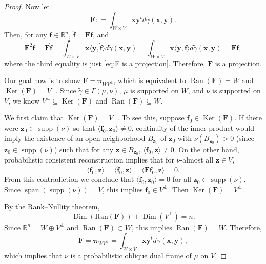 \documentclass{amsart}
\numberwithin{equation}{section}
\DeclareMathOperator{\supp}{supp}
\DeclareMathOperator{\kernel}{Ker}
\DeclareMathOperator{\range}{Ran}
\DeclareMathOperator{\Dim}{Dim}
\DeclareMathOperator{\spanning}{span}
\newcommand{\bpi}{{\boldsymbol{\pi}}}
\theoremstyle{plain}
\theoremstyle{remark}
\theoremstyle{definition}
\begin{document}
\begin{proof}
Now let 
\begin{equation*}
       \mathbf{F}: = \int_{W \times V} \mathbf{x} \mathbf{y}^t d\tilde{\gamma}(\mathbf{x}, \mathbf{y}).
    \end{equation*}
Then, for any $\mathbf{f} \in \mathbb{R}^n$, $\hat{\mathbf{f}} = \mathbf{F} \mathbf{f}$, and
\begin{equation*}
    \mathbf{F}^2 \mathbf{f} = \mathbf{F} \hat{\mathbf{f}} = \int_{W \times V} \mathbf{x} \langle \mathbf{y},  \hat{\mathbf{f}} \rangle d\tilde{\gamma}(\mathbf{x}, \mathbf{y}) = \int_{W \times V} \mathbf{x} \langle \mathbf{y},  \mathbf{f} \rangle d\tilde{\gamma}(\mathbf{x}, \mathbf{y}) = \mathbf{F} \mathbf{f},
\end{equation*}
where the third equality is just \eqref{eq:F is a projection}. Therefore, $\mathbf{F}$ is a projection.

Our goal now is to show $\mathbf{F} = \bpi_{WV^\perp}$, which is equivalent to $\range(\mathbf{F})=W$ and $\kernel(\mathbf{F}) = V^\perp$. 
Since $\tilde{\gamma} \in \Gamma(\mu, \nu)$, $\mu$ is supported on $W$, and $\nu$ is supported on $V$, we know $V^\perp \subseteq \kernel(\mathbf{F})$ and $\range(\mathbf{F}) \subseteq W$.  

We first claim that $\kernel(\mathbf{F})= V^\perp$. To see this, suppose $\mathbf{f}_0 \in \kernel(\mathbf{F})$. If there were $\mathbf{z}_0 \in \supp(\nu)$ so that $\langle \mathbf{f}_0, \mathbf{z}_0 \rangle \neq 0$, continuity of the inner product would imply the existence of an open neighborhood $B_{\mathbf{z}_0}$ of $\mathbf{z}_0$ with $\nu(B_{\mathbf{z}_0})>0$ (since $\mathbf{z}_0 \in \supp(\nu)$) such that for any $\mathbf{z} \in B_{\mathbf{z}_0}$, $ \langle \mathbf{f}_0, \mathbf{z}  \rangle \neq 0 $. On the other hand, probabilistic consistent reconstruction implies that for $\nu$-almost all $\mathbf{z} \in V$, 
\[
    \langle \mathbf{f}_0, \mathbf{z}  \rangle = \langle \hat{\mathbf{f}}_0,  \mathbf{z} \rangle = \langle \mathbf{F}\mathbf{f}_0,  \mathbf{z} \rangle=0.
\]
From this contradiction we conclude that $\langle \mathbf{f}_0, \mathbf{z}_0 \rangle = 0$ for all $\mathbf{z}_0 \in \supp(\nu)$. Since $\spanning(\supp(\nu)) = V$, this implies $\mathbf{f}_0 \in V^\perp$. Then $\kernel(\mathbf{F})= V^\perp$.

By the Rank–Nullity theorem, 
\begin{equation*}
    \Dim(\mathrm{Ran}(\mathbf{F})) + \Dim(V^\perp) = n.
\end{equation*}
Since $\mathbb{R}^n = W \oplus V^\perp$ and $\range(\mathbf{F}) \subset W$, this implies $\range(\mathbf{F}) =W$. Therefore, 
 \begin{equation*}
        \mathbf{F} = \bpi_{WV^\perp} = \int_{W \times V} \mathbf{x} \mathbf{y}^t d\tilde{\gamma}(\mathbf{x}, \mathbf{y}),
    \end{equation*}
which implies that $\nu$ is a probabilistic oblique dual frame of $\mu$ on $V$.
\end{proof}
\end{document}
